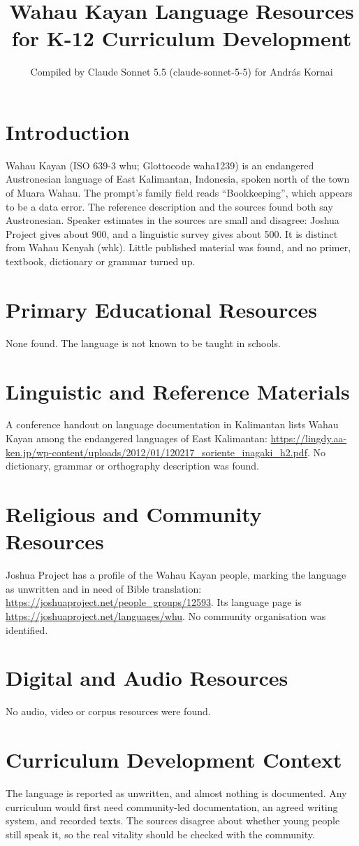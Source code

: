 \documentclass[12pt]{article}
\title{Wahau Kayan Language Resources for K-12 Curriculum Development}
\author{Compiled by Claude Sonnet 5.5 (claude-sonnet-5-5) for Andr\'as Kornai}
\date{}
\begin{document}
\maketitle

\section{Introduction}
Wahau Kayan (ISO 639-3 whu; Glottocode waha1239) is an endangered Austronesian language of East Kalimantan, Indonesia, spoken north of the town of Muara Wahau. The prompt's family field reads ``Bookkeeping'', which appears to be a data error. The reference description and the sources found both say Austronesian. Speaker estimates in the sources are small and disagree: Joshua Project gives about 900, and a linguistic survey gives about 500. It is distinct from Wahau Kenyah (whk). Little published material was found, and no primer, textbook, dictionary or grammar turned up.

\section{Primary Educational Resources}
None found. The language is not known to be taught in schools.

\section{Linguistic and Reference Materials}
A conference handout on language documentation in Kalimantan lists Wahau Kayan among the endangered languages of East Kalimantan: \url{https://lingdy.aa-ken.jp/wp-content/uploads/2012/01/120217_soriente_inagaki_h2.pdf}.
No dictionary, grammar or orthography description was found.

\section{Religious and Community Resources}
Joshua Project has a profile of the Wahau Kayan people, marking the language as unwritten and in need of Bible translation: \url{https://joshuaproject.net/people_groups/12593}. Its language page is \url{https://joshuaproject.net/languages/whu}.
No community organisation was identified.

\section{Digital and Audio Resources}
No audio, video or corpus resources were found.

\section{Curriculum Development Context}
The language is reported as unwritten, and almost nothing is documented. Any curriculum would first need community-led documentation, an agreed writing system, and recorded texts. The sources disagree about whether young people still speak it, so the real vitality should be checked with the community.
\end{document}
